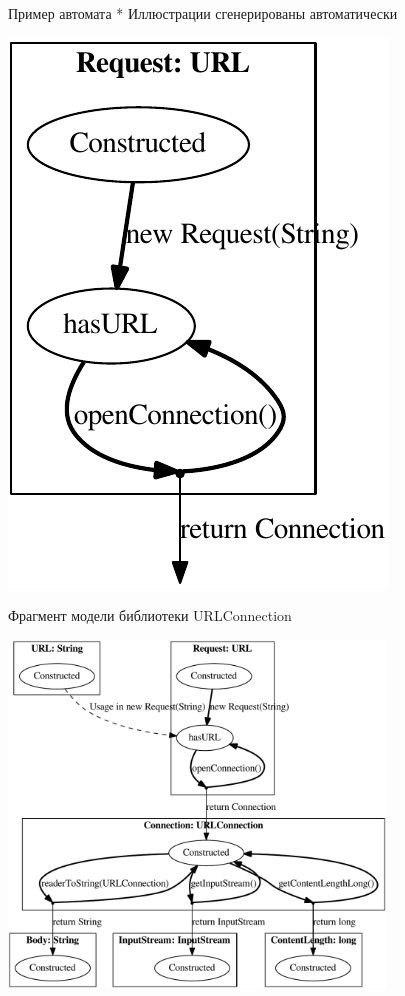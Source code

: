 \documentclass[12pt]{beamer}
\begin{document}
\begin{frame}{Пример автомата}
\begingroup
\scriptsize
* Иллюстрации сгенерированы автоматически
\endgroup
\begin{center}
	\includegraphics[height=0.8\textheight]{javaSmall-cropped.pdf}
\end{center}
\end{frame}

\begin{frame}{Фрагмент модели библиотеки URLConnection}
\begin{center}
	\includegraphics[width=0.75\textwidth]{java-cropped.pdf}
\end{center}
\end{frame}
\end{document}
